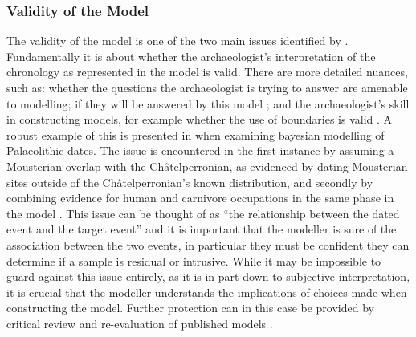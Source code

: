 \subsubsection{Validity of the Model}
The validity of the model is one of the two main issues identified by \citet{doi:10.1080/00438243.2015.1070082}. Fundamentally it is about whether the archaeologist's interpretation of the chronology as represented in the model is valid. There are more detailed nuances, such as: whether the questions the archaeologist is trying to answer are amenable to modelling; if they will be answered by this model \citep[531]{doi:10.1080/00438243.2015.1070082}; and the archaeologist's skill in constructing models, for example whether the use of boundaries is valid \citep[533]{doi:10.1080/00438243.2015.1070082}. A robust example of this is presented in \citet{doi:10.1080/00438243.2015.1065759} when examining bayesian modelling of Palaeolithic dates. The issue is encountered in the first instance by assuming a Mousterian overlap with the Ch\^atelperronian, as evidenced by dating Mousterian sites outside of the Ch\^atelperronian's known distribution, and secondly by combining evidence for human and carnivore occupations in the same phase in the model \citep[603]{doi:10.1080/00438243.2015.1065759}. This issue can be thought of as ``the relationship between the dated event and the target event'' \citep[689]{doi:10.1080/00438243.2015.1067640} and it is important that the modeller is sure of the association between the two events, in particular they must be confident they can determine if a sample is residual or intrusive. While it may be impossible to guard against this issue entirely, as it is in part down to subjective interpretation, it is crucial that the modeller understands the implications of choices made when constructing the model. Further protection can in this case be provided by critical review and re-evaluation of published models \cite{doi:10.1080/00438243.2015.1070082}.

